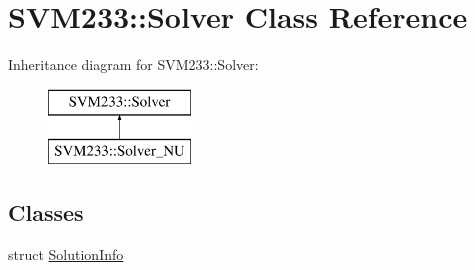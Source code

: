 \hypertarget{class_s_v_m233_1_1_solver}{}\section{S\+V\+M233\+:\+:Solver Class Reference}
\label{class_s_v_m233_1_1_solver}
Inheritance diagram for S\+V\+M233\+:\+:Solver\+:\begin{figure}[H]
\begin{center}
\leavevmode
\includegraphics[height=2.000000cm]{class_s_v_m233_1_1_solver}
\end{center}
\end{figure}
\subsection*{Classes}
\begin{DoxyCompactItemize}
\item 
struct \hyperlink{struct_s_v_m233_1_1_solver_1_1_solution_info}{Solution\+Info}
\end{DoxyCompactItemize}
